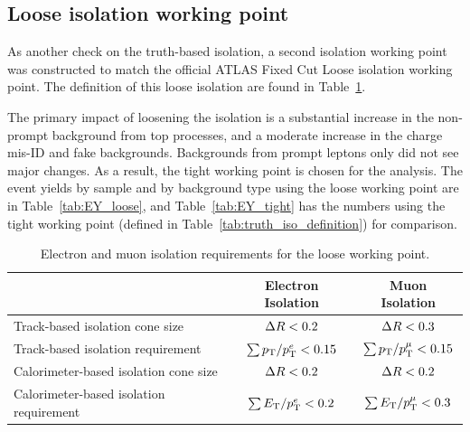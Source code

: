 \subsection{Loose isolation working point}
As another check on the truth-based isolation, a second isolation working point was constructed to match the official ATLAS Fixed Cut Loose isolation working point.
The definition of this loose isolation are found in Table~\ref{tab:isolation_cuts_loose}.

The primary impact of loosening the isolation is a substantial increase in the non-prompt background from top processes, and a moderate increase in the charge mis-ID and fake backgrounds.
Backgrounds from prompt leptons only did not see major changes.
As a result, the tight working point is chosen for the analysis.
The event yields by sample and by background type using the loose working point are in Table~\ref{tab:EY_loose}, and Table~\ref{tab:EY_tight} has the numbers using the tight working point (defined in Table~\ref{tab:truth_iso_definition}) for comparison.

\begin{table}[htbp]\renewcommand{\arraystretch}{1.2}
  \begin{center}
  \begin{tabular}{l|c|c}
    \hline\hline
				~               &   Electron Isolation & Muon Isolation \\
\hline\hline
Track-based isolation cone size   		&   $\Delta R < 0.2$         & $\Delta R < 0.3$ \\
Track-based isolation requirement    		&   $\sum p_{\mathrm{T}}/p_{\mathrm{T}}^{e} < 0.15$ & $\sum p_{\mathrm{T}}/p_{\mathrm{T}}^{\mu} < 0.15$ \\
Calorimeter-based isolation cone size   	&   $\Delta R < 0.2$	    & $\Delta R < 0.2$\\
Calorimeter-based isolation requirement    	&   $\sum E_{\mathrm{T}}/p_{\mathrm{T}}^{e} <  0.2$ & $\sum E_{\mathrm{T}}/p_{\mathrm{T}}^{\mu} <  0.3$	\\
\hline
 \end{tabular}
  \end{center}
  \caption{Electron and muon isolation requirements for the loose working point.} 
  \label{tab:isolation_cuts_loose}
\end{table}




\FloatBarrier
